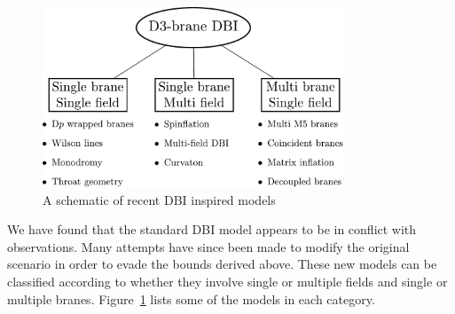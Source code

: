 \label{sec:others-dbi}
\begin{figure}[htbp]
 \centering
 \includegraphics[width=0.8\textwidth]{./dbi/graphs/dbi-review.pdf}
 \caption{A schematic of recent DBI inspired models}
 \label{fig:review-dbi}
\end{figure}
% 

We have found that the standard DBI model appears to be in conflict with
observations. Many attempts have since been made to modify the original scenario in
order to evade the bounds derived above. These new models can be classified according
to
whether they involve single or multiple fields and single or multiple branes.
Figure~\ref{fig:review-dbi} lists some of the models in
each category.


